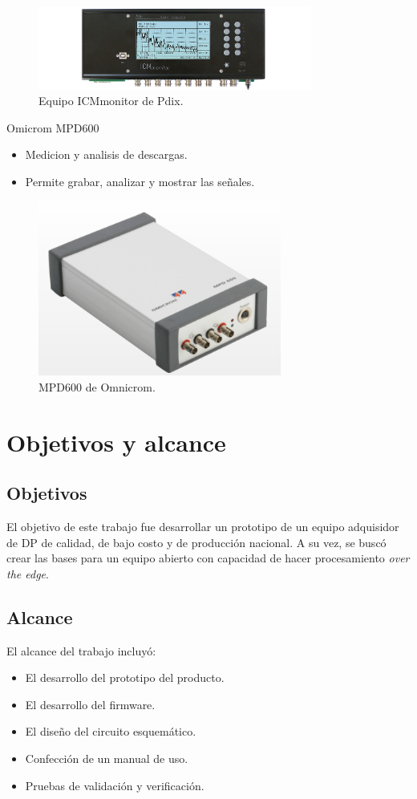 \begin{figure}[h!]
	\centering
	\includegraphics[width=90mm]{./Figures/arte2.png}
	\caption{Equipo ICMmonitor de Pdix.}
	\label{fig:arte2}
\end{figure}


Omicrom MPD600 \citep{mpdWeb:1}
\begin{itemize}
\item Medicion y analisis de descargas.
\item Permite grabar, analizar y mostrar las señales.
\end{itemize}

\begin{figure}[h!]
	\centering
	\includegraphics[width=80mm]{./Figures/arte3.png}
	\caption{MPD600 de Omnicrom.}
	\label{fig:arte3}
\end{figure}

\section{Objetivos y alcance}
\subsection{Objetivos}
El objetivo de este trabajo fue desarrollar un prototipo de un equipo adquisidor de DP de calidad, de bajo costo y de producción nacional. A su vez, se buscó crear las bases para un equipo abierto con capacidad de hacer procesamiento \textit{over the edge}. 

\subsection{Alcance}
El alcance del trabajo incluyó:
\begin{itemize}
\item El desarrollo del prototipo del producto.
\item El desarrollo del firmware.
\item El diseño del circuito esquemático.
\item Confección de un manual de uso.
\item Pruebas de validación y verificación.
\end{itemize}

